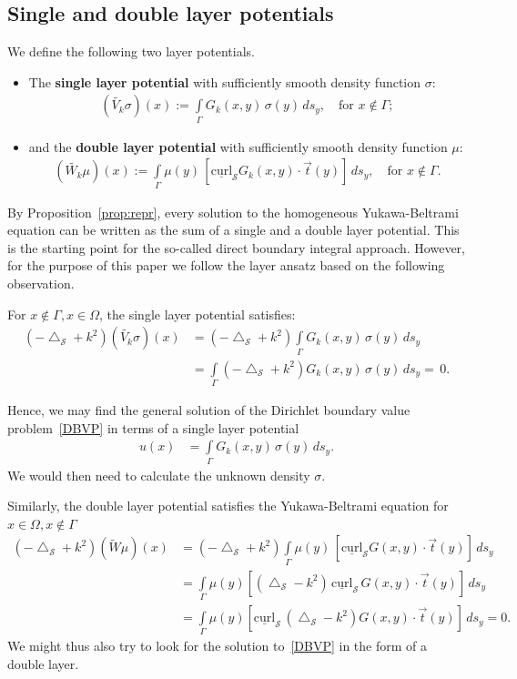 \documentclass[final]{siamltex}
\newcommand{\lap}{\bigtriangleup}
\renewcommand{\S} {\mathcal{S}}
\begin{document}
\subsection{Single and double layer potentials}
We define the following two layer potentials.
\begin{itemize}
\item The {\bf single layer potential} with sufficiently smooth density function $\sigma$:
  \begin{align*}
    (\widetilde{V_k}\sigma)(x):=\int\limits_{\Gamma}
    G_k(x,y)\,\sigma(y)\,ds_y,\quad\mbox{for $x \notin \Gamma$};
  \end{align*}
\item and the {\bf double layer potential} with sufficiently smooth density function $\mu$:
  \begin{align*}
    (\widetilde{W_k}\mu )(x):=\int\limits_{\Gamma}
    \mu(y)\,[\underline{\mbox{curl}}_{\S} G_k(x,y)\cdot \vec{t}(y)]\,
    ds_y, \quad\mbox{for $x\notin\Gamma$}.
  \end{align*}
\end{itemize}
By Proposition~\ref{prop:repr}, every solution to the homogeneous
Yukawa-Beltrami equation can be written as the sum of a single and a
double layer potential.  This  is the starting point for the so-called
direct boundary integral approach. However, for the purpose of this
paper we follow the layer ansatz based on the following observation.

For $x\notin\Gamma, x\in \Omega$, the single layer potential satisfies:
\begin{align*}
  (-\lap_{\S} + k^{2}) (\widetilde{V_k}\sigma)(x)& =
  (-\lap_{\S} + k^2) \int\limits_\Gamma G_k(x,y)\, \sigma(y)\,ds_{y} \\
  & = \int\limits_\Gamma (-\lap_{\S}+k^2) G_k(x,y)\, 
    \sigma(y)\,ds_{y}= \, 0.
\end{align*}

Hence, we may find the general solution of the Dirichlet boundary value
problem~\eqref{DBVP} in terms of a single layer potential
\begin{align*}
  u(x) & =  \int\limits_\Gamma G_k(x,y) \,\sigma(y) \,ds_{y}. 
\end{align*}
We would then need to calculate the unknown density $\sigma$.
 
Similarly, the double layer potential satisfies the Yukawa-Beltrami
equation for $x\in \Omega, x\notin\Gamma$
\begin{align*}
(-\lap_{\S} + k^2)(\widetilde{W}\mu)(x) & = (-\lap_{\S}+k^2)
\int\limits_\Gamma \mu(y)\, [\underline{\mbox{curl}}_{\S}
G(x,y)\cdot\vec{t}(y)]\,ds_{y} \\
&=\int\limits_\Gamma \mu(y)
[(\lap_{\S}-k^2)\,\underline{\mbox{curl}}_{\S}\,
G(x,y)\cdot\vec{t}(y)]\,ds_{y} \\ 
&=\int\limits_\Gamma \mu(y) [\underline{\mbox{curl}}_{\S} \,
(\lap_{\S} -k^2)G(x,y)\cdot\vec{t}(y)]\,ds_{y} = 0.
\end{align*}
We might thus also try to look for the solution to~\eqref{DBVP} in the
form of a double layer.
\end{document}
